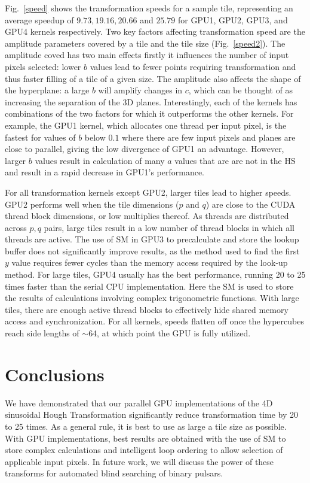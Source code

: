 \documentclass[11pt,twoside]{article}
\begin{document}
Fig.~\ref{speed} shows the transformation speeds for a sample tile, representing an average speedup of $9.73, 19.16, 20.66$ and $25.79$ for GPU1, GPU2, GPU3, and GPU4  kernels respectively.
Two key factors affecting transformation speed are the amplitude parameters covered by a tile and the tile size (Fig.~\ref{speed2}).
The amplitude coved has two main effects firstly it influences the number of input pixels selected: lower $b$ values lead to fewer points requiring transformation and thus faster filling of a tile of a given size.
The amplitude also affects the shape of the hyperplane: a large $b$ will amplify changes in $c$, which can be thought of as increasing the separation of the 3D planes.
Interestingly, each of the kernels has combinations of the two factors for which it outperforms the other kernels.
For example, the GPU1 kernel, which allocates one thread per input pixel, is the fastest for values of $b$ below $0.1$ where there are few input pixels and planes are close to parallel, giving the low divergence of GPU1 an advantage.
However, larger $b$ values result in  calculation of many $a$ values that are are not in the HS and result in a rapid decrease in GPU1's performance.

For all transformation kernels except GPU2, larger tiles lead to higher speeds.
GPU2 performs well when the tile dimensions ($p$ and $q$) are close to the CUDA thread block dimensions, or low multiplies thereof.
As threads are distributed across $p,q$ pairs, large tiles result in a low number of thread blocks in which all threads are active.
The use of SM in GPU3 to precalculate and store the lookup buffer does not significantly improve results, as the method used to find the first $y$ value requires fewer cycles than the memory access required by the look-up method.
For large tiles, GPU4 usually has the best performance, running  20 to 25 times faster than the serial CPU implementation.
Here the SM is used to store the results of calculations involving complex trigonometric functions.
With large tiles, there are enough active thread blocks to effectively hide shared memory access and synchronization.
For all kernels, speeds flatten off once the hypercubes reach side lengths of $\sim$64, at which point the GPU is fully utilized.

\section{Conclusions}
\label{Conclusion}

We have demonstrated that our parallel GPU implementations of the 4D sinusoidal Hough Transformation significantly reduce transformation time by 20 to 25 times.
As a general rule, it is best to use as large a tile size as possible.
With GPU implementations, best results are obtained with the use of SM to store complex calculations and intelligent loop ordering to allow selection of applicable input pixels.
In future work, we will discuss the power of these transforms for automated blind searching of binary pulsars.  


\end{document}
